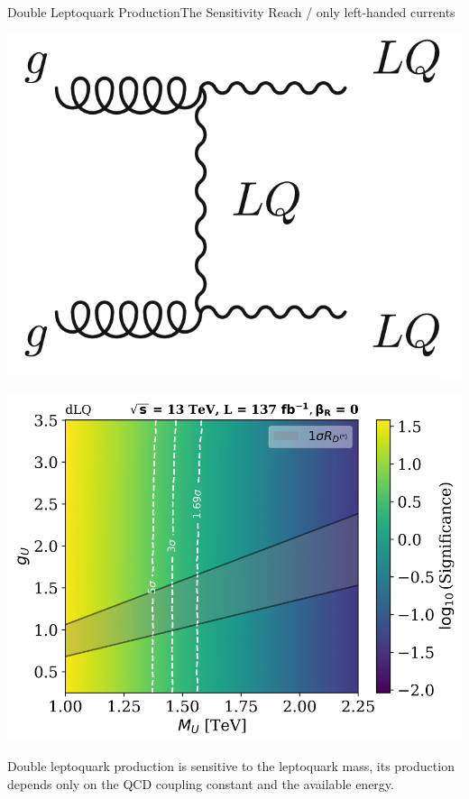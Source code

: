 \documentclass{../bredelebeamer}
\begin{document}
\begin{frame}{Double Leptoquark Production}{The Sensitivity Reach / only left-handed currents}
	\begin{minipage}{.30\linewidth}
		\includegraphics[width=\linewidth]{double_LQ.png}
	\end{minipage}
	\begin{minipage}{.68\linewidth}
		\includegraphics[width=\linewidth]{Significance_Heatmap_13TeV_L137_dLQ_combined_woRHC.pdf}
	\end{minipage}
	{\large
	  Double leptoquark production is sensitive to the leptoquark mass, its production depends only on the QCD coupling constant and the available energy.
	}
\end{frame}
\end{document}
